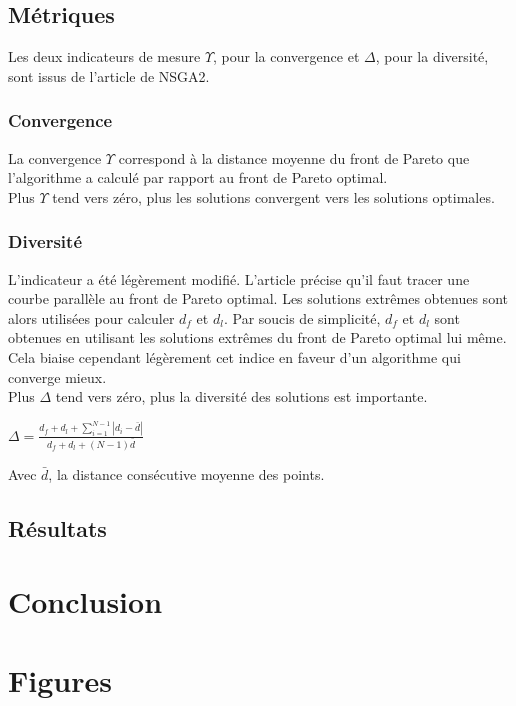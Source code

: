 \documentclass[12pt, letterpaper]{article}
\begin{document}
\FloatBarrier

\subsection{Métriques}
Les deux indicateurs de mesure $\Upsilon$, pour la convergence et
$\Delta$, pour la diversité, sont issus de l'article de NSGA2.

\subsubsection{Convergence}
La convergence $\Upsilon$ correspond à la distance moyenne du front
de Pareto que l'algorithme a calculé par rapport au front de Pareto
optimal.\\


Plus $\Upsilon$ tend vers zéro, plus les solutions convergent vers
les solutions optimales.

\subsubsection{Diversité}
L'indicateur a été légèrement modifié. L'article précise qu'il faut
tracer une courbe parallèle au front de Pareto optimal. Les solutions
extrêmes obtenues sont alors utilisées pour calculer $d_f$ et
$d_l$. Par soucis de simplicité, $d_f$ et $d_l$ sont obtenues en
utilisant les solutions extrêmes du front de Pareto optimal lui
même. Cela biaise cependant légèrement cet indice en faveur d'un
algorithme qui converge mieux.\\

Plus $\Delta$ tend vers zéro, plus la diversité des solutions est
importante.

\begin{center}
  $\Delta = \frac{d_f + d_l + \sum_{i = 1}^{N - 1} |d_i - \bar{d}|}{d_f + d_l + (N - 1) \bar{d}}$
\end{center}

Avec $\bar{d}$, la distance consécutive moyenne des points.

\subsection{Résultats}

\newpage

\section{Conclusion}


\newpage

\section{Figures}

\FloatBarrier
\end{document}
